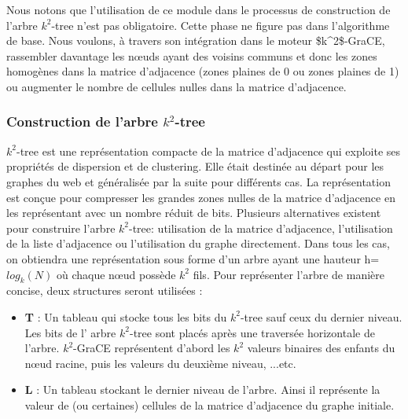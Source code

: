 \documentclass[a4paper,oneside,12pt]{report}
\theoremstyle{definition}
\begin{document}
Nous notons que l'utilisation de ce module dans le processus de construction de l'arbre $k^2$-tree n'est pas obligatoire. Cette phase ne figure pas dans l'algorithme de base. Nous voulons, à travers son intégration dans le moteur \gls{$k^2$-GraCE}, rassembler davantage les nœuds ayant des voisins communs et donc les zones homogènes dans la matrice d'adjacence (zones plaines de 0 ou zones plaines de 1) ou augmenter le nombre de cellules nulles dans la matrice d'adjacence.
		
			\subsubsection{Construction de l'arbre $k^2$-tree}
			
			$k^2$-tree est une représentation compacte de la matrice d'adjacence qui exploite ses propriétés de dispersion et de clustering. Elle était destinée au départ pour les graphes du web et généralisée par la suite pour différents cas. La représentation est conçue pour compresser les grandes zones nulles de la matrice d'adjacence en les représentant avec un nombre réduit de bits. Plusieurs alternatives existent pour construire l'arbre $k^2$-tree: utilisation de la matrice d'adjacence, l'utilisation de la liste d'adjacence ou l'utilisation du graphe directement. Dans tous les cas, on obtiendra une représentation sous forme d'un arbre ayant une hauteur h= $log_k(N)$ où chaque nœud possède $k^2$ fils. 
			  Pour représenter l'arbre de manière concise, deux structures seront utilisées :
			\begin{itemize}
			\item \textbf{T }: Un tableau qui stocke tous les bits du $k^2$-tree sauf ceux du dernier niveau. Les bits de l' arbre $k^2$-tree sont placés après une traversée horizontale de l'arbre. $k^2$-GraCE représentent d'abord les $k^2$ valeurs binaires des enfants du nœud racine, puis les valeurs du deuxième niveau, ...etc.
			
			\item  \textbf{L} : Un tableau stockant le dernier niveau de l'arbre. Ainsi il représente la valeur de (ou certaines) cellules de la matrice d'adjacence du graphe initiale.
			\end{itemize}
			
\end{document}

